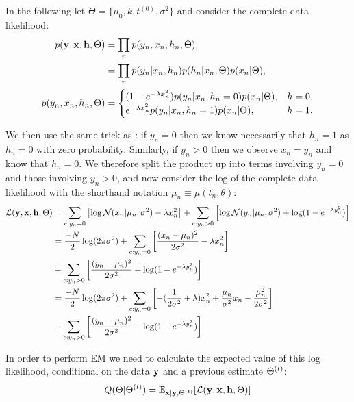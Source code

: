 In the following let $\Theta = \{\mu_0, k, t^{(0)}, \sigma^2\}$ and consider the complete-data likelihood:
\begin{equation}
	\begin{aligned}
p({\bf y}, {\bf x}, {\bf h}, \Theta) & = \prod_n p(y_n, x_n, h_n, \Theta), \\
& = \prod_n p(y_n | x_n, h_n) p(h_n | x_n, \Theta) p(x_n | \Theta), \\
	p(y_n, x_n, h_n, \Theta) & =
	\begin{cases}
		 (1 - e^{-\lambda x_n^2}) p(y_n | x_n, h_n = 0)  p(x_n | \Theta), & h = 0, \\
		 e^{-\lambda x_n^2} p(y_n | x_n, h_n = 1)  p(x_n | \Theta) , & h = 1. \\
	 \end{cases}
\end{aligned}
\end{equation}


We then use the same trick as \cite{pierson2015zifa}: if $y_n = 0$ then we know necessarily that $h_n = 1$ as $h_n = 0$ with zero probability. Similarly, if $y_n > 0$ then we observe $x_n = y_n$ and know that $h_n = 0$. We therefore split the product up into terms involving $y_n = 0$ and those involving $y_n > 0$, and now consider the log of the complete data likelihood with the shorthand notation $\mu_n \equiv \mu(t_n, \theta)$:
\begin{equation} \label{eq:lcl}
\begin{aligned}
\mathcal{L}({\bf y}, {\bf x}, {\bf h}, \Theta) & = \sum_{c: y_n = 0} \left[ \log \mathcal{N}(x_n | \mu_n, \sigma^2) - \lambda x_n^2 \right] + \sum_{c: y_n > 0} \left[ \log \mathcal{N}(y_n | \mu_n, \sigma^2) + \log(1 - e^{-\lambda y_n^2}) \right] \\
& = \frac{-N}{2} \log(2 \pi \sigma^2)
 + \sum_{c: y_n = 0} \left[ \frac{(x_n - \mu_n)^2}{2 \sigma^2} - \lambda x_n^2 \right]\\
& + \sum_{c: y_n > 0} \left[ \frac{(y_n - \mu_n)^2}{2 \sigma^2} + \log(1 - e^{-\lambda y_n^2}) \right] \\
& = \frac{-N}{2} \log(2 \pi \sigma^2) +
\sum_{c: y_n = 0} \left[ -(\frac{1}{2\sigma^2} + \lambda) x_n^2 + \frac{\mu_n}{\sigma^2} x_n - \frac{\mu_n^2}{2\sigma^2}\right] \\
& +
\sum_{c: y_n > 0} \left[ \frac{(y_n - \mu_n)^2}{2 \sigma^2} + \log(1 - e^{-\lambda y_n^2}) \right]
\end{aligned}
\end{equation}

In order to perform EM we need to calculate the expected value of this log likelihood, conditional on the data ${\bf y}$ and a previous estimate $\Theta^{(t)}$:
\begin{equation}
Q(\Theta|\Theta^{(t)}) = \mathbb{E}_{{\bf x} | {\bf y}, \Theta^{(t)}} [\mathcal{L}({\bf y}, {\bf x}, {\bf h}, \Theta)]
\end{equation}

